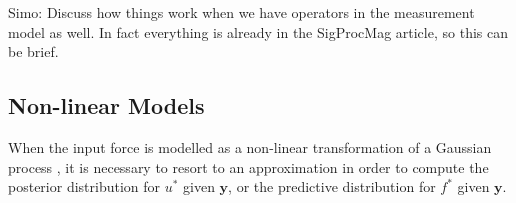 \documentclass[journal]{IEEEtran}
\newcommand{\simo}[1]{{\color{red}#1}}
\begin{document}
\simo{Simo: Discuss how things work when we have operators in the measurement model as well. In fact everything is already in the SigProcMag article, so this can be brief.}



%
%
%

%
%
\subsection{Non-linear Models}


When the input force is modelled as a non-linear transformation of a Gaussian process \cite{Lawrence:gpsim2007a,
Gao:latent08, Titsias:BMC:2012}, it is necessary to resort to an approximation in order to compute the posterior
distribution for $u^*$ given $\mathbf{y}$, or the predictive distribution for $f^*$ given $\mathbf{y}$.
\end{document}
